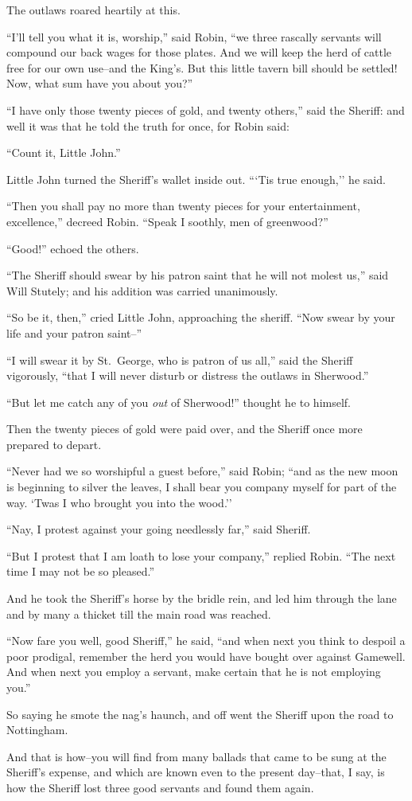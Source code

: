 The outlaws roared heartily at this.

``I'll tell you what it is, worship,'' said Robin, ``we three rascally
servants will compound our back wages for those plates. And we will keep
the herd of cattle free for our own use--and the King's. But this little
tavern bill should be settled! Now, what sum have you about you?''

``I have only those twenty pieces of gold, and twenty others,'' said the
Sheriff: and well it was that he told the truth for once, for Robin
said:

``Count it, Little John.''

Little John turned the Sheriff's wallet inside out. ```Tis true
enough,'' he said.

``Then you shall pay no more than twenty pieces for your entertainment,
excellence,'' decreed Robin. ``Speak I soothly, men of greenwood?''

``Good!'' echoed the others.

``The Sheriff should swear by his patron saint that he will not molest
us,'' said Will Stutely; and his addition was carried unanimously.

``So be it, then,'' cried Little John, approaching the sheriff. ``Now
swear by your life and your patron saint--''

``I will swear it by St.~George, who is patron of us all,'' said the
Sheriff vigorously, ``that I will never disturb or distress the outlaws
in Sherwood.''

``But let me catch any of you \emph{out} of Sherwood!'' thought he to
himself.

Then the twenty pieces of gold were paid over, and the Sheriff once more
prepared to depart.

``Never had we so worshipful a guest before,'' said Robin; ``and as the
new moon is beginning to silver the leaves, I shall bear you company
myself for part of the way. `Twas I who brought you into the wood.''

``Nay, I protest against your going needlessly far,'' said Sheriff.

``But I protest that I am loath to lose your company,'' replied Robin.
``The next time I may not be so pleased.''

And he took the Sheriff's horse by the bridle rein, and led him through
the lane and by many a thicket till the main road was reached.

``Now fare you well, good Sheriff,'' he said, ``and when next you think
to despoil a poor prodigal, remember the herd you would have bought over
against Gamewell. And when next you employ a servant, make certain that
he is not employing you.''

So saying he smote the nag's haunch, and off went the Sheriff upon the
road to Nottingham.

And that is how--you will find from many ballads that came to be sung at
the Sheriff's expense, and which are known even to the present
day--that, I say, is how the Sheriff lost three good servants and found
them again.
